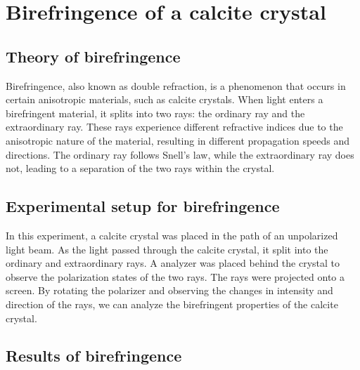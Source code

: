 \section{Birefringence of a calcite crystal}

    \subsection{Theory of birefringence}
    Birefringence, also known as double refraction, is a phenomenon that occurs in certain anisotropic materials, such as calcite crystals.
    When light enters a birefringent material, it splits into two rays: the ordinary ray and the extraordinary ray. These rays experience different
    refractive indices due to the anisotropic nature of the material, resulting in different propagation speeds and directions. The ordinary ray follows
    Snell's law, while the extraordinary ray does not, leading to a separation of the two rays within the crystal.

    \subsection{Experimental setup for birefringence}
    In this experiment, a calcite crystal was placed in the path of an unpolarized light beam. As the light passed through the calcite crystal, it split into
    the ordinary and extraordinary rays. A analyzer was placed behind the crystal to observe the polarization states of the two rays. The rays were projected
    onto a screen. By rotating the polarizer and observing the changes in intensity and direction of the rays, we can analyze the birefringent properties of
    the calcite crystal.

    \subsection{Results of birefringence}
    